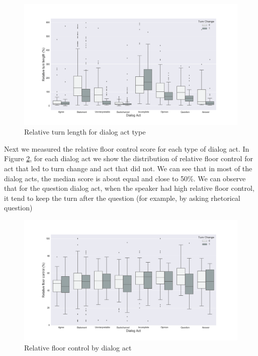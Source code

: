 \begin{figure}[ht!]
\centering
\includegraphics[width=\textwidth]{../scikitlearn/figures/f3.png}
\caption{Relative turn length for dialog act type}
\label{fig:act:turn:rtl}
\end{figure}

Next we measured the relative floor control score for each type of dialog act.
In Figure \ref{fig:act:turn:rfc}, for each dialog act we show the distribution of relative floor control for act that
led to turn change and act that did not. We can see that in most of the dialog acts,
the median score is about equal and close to 50\%. We can observe that for the question dialog act, when the speaker had high relative floor control, it tend to keep the turn after the question (for example, by asking rhetorical question)

\begin{figure}[ht!]
\centering
\includegraphics[width=\textwidth]{../scikitlearn/figures/f4.png}
\caption{Relative floor control by dialog act}
\label{fig:act:turn:rfc}
\end{figure}


